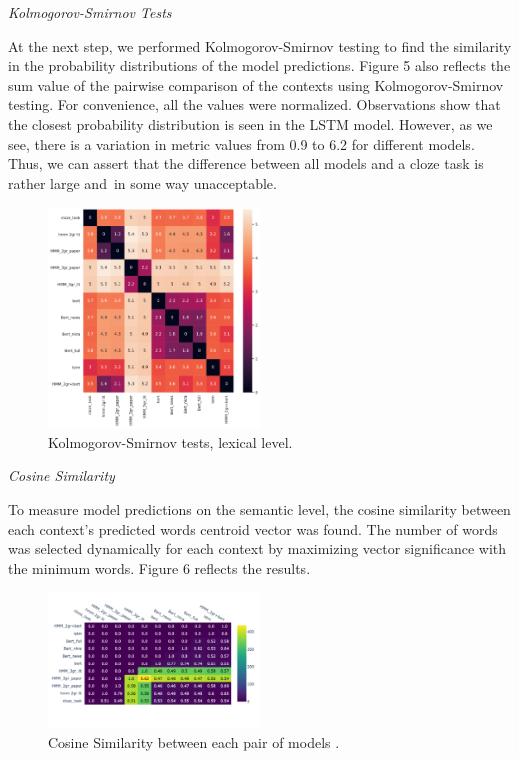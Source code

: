 \documentclass[a4paper]{article}
\newcommand{\head}[1]{\vspace{0.5em}\emph{#1}\vspace{0.25em}}
\begin{document}
\head{Kolmogorov-Smirnov Tests}

At the next step, we performed Kolmogorov-Smirnov testing to find the similarity in the probability distributions of the model predictions. Figure 5 also reflects the sum value of the pairwise comparison of the contexts using Kolmogorov-Smirnov testing. For convenience, all the values were normalized. Observations show that the closest probability distribution is seen in the LSTM model. However, as we see, there is a variation in metric values from 0.9 to 6.2 for different models. Thus, we can assert that the difference between all models and a cloze task is rather large and in some way unacceptable.

\begin{figure}
\caption{Kolmogorov-Smirnov tests, lexical level.}
\label{fig:ks-lexical}
\centering
\includegraphics[width=0.5\textwidth]{figures/pdf/ks-lexical.pdf}
\end{figure}

\head{Cosine Similarity}

To measure model predictions on the semantic level, the cosine similarity between each context’s predicted words centroid vector was found. The number of words was selected dynamically for each context by maximizing vector significance with the minimum words. Figure 6 reflects the results.
\begin{figure}
\caption{Cosine Similarity between each pair of models .}
\label{fig:ks-lexical}
\centering
\includegraphics[width=0.5\textwidth]{figures/pdf/cosine-similarity-lexical.pdf}
\end{figure}
\end{document}
